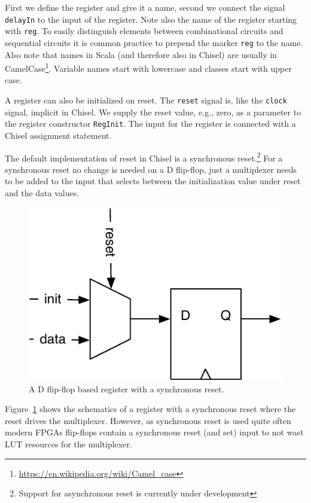 \documentclass[%
    10pt,
    headinclude, footexclude,
    openright, %
    notitlepage,
    cleardoubleempty,
    headsepline,
    pointlessnumbers,
    bibtotoc, idxtotoc,
    ]{scrbook}
\newcommand{\code}[1]{{\small{\texttt{#1}}}}
\newcommand{\scale}{0.7}
\newcommand{\myref}[2]{\href{#1}{#2}}
\renewcommand{\myref}[2]{{#2}{\footnote{\url{#1}}}}
\begin{document}
First we define the register and give it a name, second we connect the signal
\code{delayIn} to the input of the register. Note also the name of the register
starting with \code{reg}. To easily distinguish elements between combinational
circuits and sequential circuits it is common practice to prepend the marker
\code{reg} to the name. Also note that names in Scala (and therefore
also in Chisel) are usually in
\myref{https://en.wikipedia.org/wiki/Camel_case}{CamelCase}.
Variable names start with lowercase and classes start with upper case.

A register can also be initialized on reset. The \code{reset} signal is, like the \code{clock} signal,
implicit in Chisel. We supply the reset value, e.g., zero, as a parameter to the register
constructor \code{RegInit}. The input for the register is connected with a Chisel
assignment statement.


The default implementation of reset in Chisel is a synchronous
reset.\footnote{Support for asynchronous reset is currently under development}
For a synchronous reset no change is needed on a D flip-flop, just a multiplexer
needs to be added to the input that selects between the initialization value under
reset and the data values.


\begin{figure}
  \centering
  \includegraphics[scale=\scale]{figures/register-reset}
  \caption{A D flip-flop based register with a synchronous reset.}
  \label{fig:register-reset}
\end{figure}

Figure~\ref{fig:register-reset} shows the schematics of a register with a synchronous reset
where the reset drives the multiplexer. However, as synchronous reset is used quite often
modern FPGAs flip-flops contain a synchronous reset (and set) input to not wast LUT
resources for the multiplexer.
\end{document}
